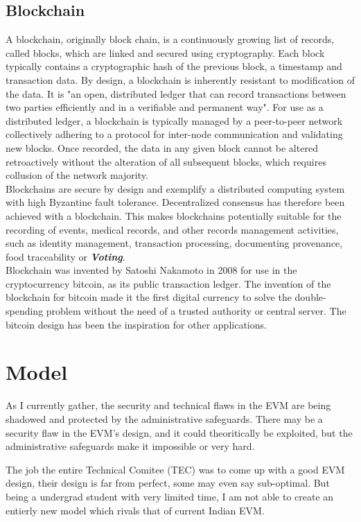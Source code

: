 \documentclass[12pt]{report}
\begin{document}
\section{Blockchain}
A blockchain, originally block chain, is a continuously growing list of records, called blocks, which are linked and secured using cryptography. Each block typically contains a cryptographic hash of the previous block, a timestamp and transaction data. By design, a blockchain is inherently resistant to modification of the data. It is "an open, distributed ledger that can record transactions between two parties efficiently and in a verifiable and permanent way". For use as a distributed ledger, a blockchain is typically managed by a peer-to-peer network collectively adhering to a protocol for inter-node communication and validating new blocks. Once recorded, the data in any given block cannot be altered retroactively without the alteration of all subsequent blocks, which requires collusion of the network majority.
\\
Blockchains are secure by design and exemplify a distributed computing system with high Byzantine fault tolerance. Decentralized consensus has therefore been achieved with a blockchain. This makes blockchains potentially suitable for the recording of events, medical records, and other records management activities, such as identity management, transaction processing, documenting provenance, food traceability or \textbf{\textit{Voting}}.
\\
Blockchain was invented by Satoshi Nakamoto in 2008 for use in the cryptocurrency bitcoin, as its public transaction ledger. The invention of the blockchain for bitcoin made it the first digital currency to solve the double-spending problem without the need of a trusted authority or central server. The bitcoin design has been the inspiration for other applications.

\chapter{Model}
As I currently gather, the security and technical flaws in the EVM are being shadowed and protected by the administrative safeguards. There may be a security flaw in the EVM's design, and it could theoritically be exploited, but the administrative safeguards make it impossible or very hard.

The job the entire Technical Comitee (TEC) was to come up with a good EVM design, their design is far from perfect, some may even say sub-optimal. 
But being a undergrad student with very limited time, I am not able to create an entierly new model which rivals that of current Indian EVM.
\end{document}

